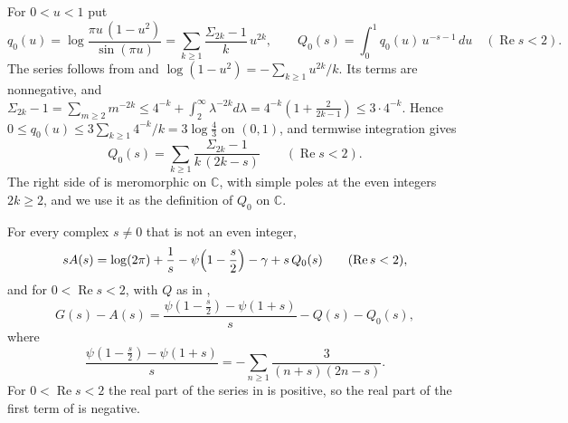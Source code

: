For $0<u<1$ put
\begin{equation}\label{eq:q0}
q_0(u)=\log\frac{\pi u\,(1-u^2)}{\sin(\pi u)}=\sum_{k\ge1}\frac{\Sigma_{2k}-1}{k}\,u^{2k},\qquad Q_0(s)=\int_0^1q_0(u)\,u^{-s-1}\,du\quad(\operatorname{Re}s<2).
\end{equation}
The series follows from  and $\log(1-u^2)=-\sum_{k\ge1}u^{2k}/k$. Its terms are nonnegative, and $\Sigma_{2k}-1=\sum_{m\ge2}m^{-2k}\le4^{-k}+\int_2^\infty\lambda^{-2k}d\lambda=4^{-k}(1+\frac2{2k-1})\le3\cdot4^{-k}$. Hence $0\le q_0(u)\le3\sum_{k\ge1}4^{-k}/k=3\log\frac43$ on $(0,1)$, and termwise integration gives
\begin{equation}\label{eq:Q0series}
Q_0(s)=\sum_{k\ge1}\frac{\Sigma_{2k}-1}{k\,(2k-s)}\qquad(\operatorname{Re}s<2).
\end{equation}
The right side of  is meromorphic on $\mathbb C$, with simple poles at the even integers $2k\ge2$, and we use it as the definition of $Q_0$ on $\mathbb C$.

\begin{proposition}\label{prop:GAdigamma}
For every complex $s\ne0$ that is not an even integer,
\begin{equation}\label{eq:sA}
sA(s)=\log(2\pi)+\frac1s-\psi\Bigl(1-\frac s2\Bigr)-\gamma+s\,Q_0(s)\qquad(\operatorname{Re}s<2),
\end{equation}
and for $0<\operatorname{Re}s<2$, with $Q$ as in ,
\begin{equation}\label{eq:GAthree}
G(s)-A(s)=\frac{\psi(1-\frac s2)-\psi(1+s)}{s}-Q(s)-Q_0(s),
\end{equation}
where
\begin{equation}\label{eq:digseries}
\frac{\psi(1-\frac s2)-\psi(1+s)}{s}=-\sum_{n\ge1}\frac{3}{(n+s)(2n-s)} .
\end{equation}
For $0<\operatorname{Re}s<2$ the real part of the series in  is positive, so the real part of the first term of  is negative.
\end{proposition}

